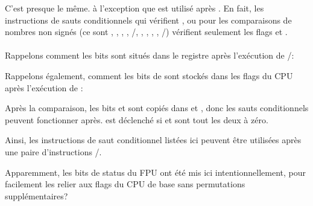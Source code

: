 



C'est presque le même. à l'exception que \JA est utilisé après \SAHF.
En fait, les instructions de sauts conditionnels qui vérifient ,  ou  pour
les comparaisons de nombres non signés (ce sont \JA, \JAE, \JB, \JBE, \JE/\JZ, \JNA,
\JNAE, \JNB, \JNBE, \JNE/\JNZ) vérifient seulement les flags \CF et \ZF.\\
\\
Rappelons comment les bits \CThreeBits sont situés dans le registre  après
l'exécution de /\FNSTSW:



Rappelons également, comment les bits de  sont stockés dans les flags du
CPU après l'exécution de \SAHF:



Après la comparaison, les bits \Cthree et \Czero sont copiés dans \ZF et \CF, donc
les sauts conditionnels peuvent fonctionner après. \JA est déclenché si \CF et \ZF
sont tout les deux à zéro.

Ainsi, les instructions de saut conditionnel listées ici peuvent être utilisées après
une paire d'instructions \FNSTSW/\SAHF.

Apparemment, les bits de status du FPU \CThreeBits ont été mis ici intentionnellement,
pour facilement les relier aux flags du CPU de base sans permutations supplémentaires?


